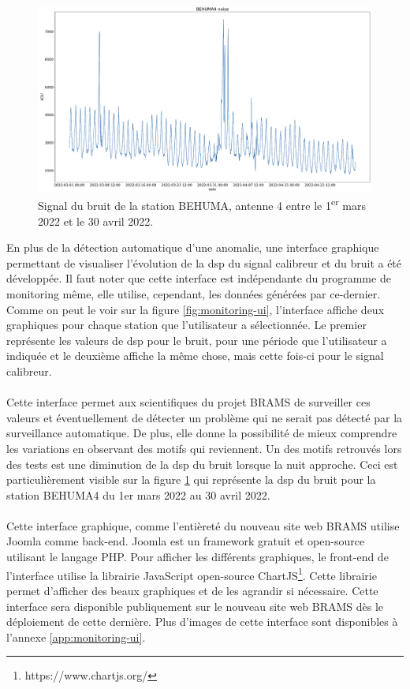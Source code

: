 \documentclass[11pt]{article}
\begin{document}
\begin{figure}[t]
    \begin{center}
        \includegraphics[scale=0.17]{BEHUMA4_2022-03-01_2022-04-30_noise.png}
        \caption{Signal du bruit de la station BEHUMA, antenne 4 entre le 1\textsuperscript{er} mars 2022 et le 30 avril 2022.}
        \label{fig:BEHUMA4-variations}
    \end{center}
\end{figure}

En plus de la détection automatique d'une anomalie, une interface graphique permettant de visualiser l'évolution de la dsp du signal calibreur et du bruit a été développée.
Il faut noter que cette interface est indépendante du programme de monitoring même, elle utilise, cependant, les données générées par ce-dernier.
Comme on peut le voir sur la figure  \ref{fig:monitoring-ui}, l'interface affiche deux graphiques pour chaque station que l'utilisateur a sélectionnée.
Le premier représente les valeurs de dsp pour le bruit, pour une période que l'utilisateur a indiquée et le deuxième affiche la même chose, mais cette fois-ci pour le signal calibreur.\\
\\
Cette interface permet aux scientifiques du projet BRAMS de surveiller ces valeurs et éventuellement de détecter un problème qui ne serait pas détecté par la surveillance automatique.
De plus, elle donne la possibilité de mieux comprendre les variations en observant des motifs qui reviennent.
Un des motifs retrouvés lors des tests est une diminution de la dsp du bruit lorsque la nuit approche.
Ceci est particulièrement visible sur la figure \ref{fig:BEHUMA4-variations} qui représente la dsp du bruit pour la station BEHUMA4 du 1er mars 2022 au 30 avril 2022.\\
\\
Cette interface graphique, comme l'entièreté du nouveau site web BRAMS utilise Joomla comme back-end.
Joomla est un framework gratuit et open-source utilisant le langage PHP.
Pour afficher les différents graphiques, le front-end de l'interface utilise la librairie JavaScript open-source ChartJS\footnote{https://www.chartjs.org/}.
Cette librairie permet d'afficher des beaux graphiques et de les agrandir si nécessaire.
Cette interface sera disponible publiquement sur le nouveau site web BRAMS dès le déploiement de cette dernière.
Plus d'images de cette interface sont disponibles à l'annexe \ref{app:monitoring-ui}.
\end{document}
